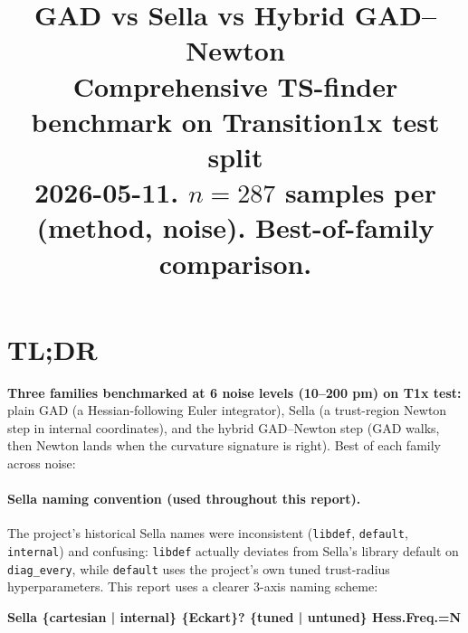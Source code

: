 \documentclass[11pt]{article}
\title{\Large\textbf{GAD vs Sella vs Hybrid GAD--Newton}\\[4pt]
\large Comprehensive TS-finder benchmark on Transition1x test split\\[2pt]
\normalsize 2026-05-11. $n=287$ samples per (method, noise). Best-of-family comparison.}
\author{}
\date{}
\begin{document}
\maketitle
\thispagestyle{empty}

\section*{TL;DR}

\textbf{Three families benchmarked at 6 noise levels (10--200 pm) on
T1x test:} plain GAD (a Hessian-following Euler integrator), Sella (a
trust-region Newton step in internal coordinates), and the hybrid
GAD--Newton step (GAD walks, then Newton lands when the curvature
signature is right). Best of each family across noise:

\begin{center}\small{}
\end{center}

\paragraph{Sella naming convention (used throughout this report).}
The project's historical Sella names were inconsistent (\texttt{libdef},
\texttt{default}, \texttt{internal}) and confusing: \texttt{libdef}
actually deviates from Sella's library default on \texttt{diag\_every},
while \texttt{default} uses the project's own tuned trust-radius
hyperparameters. This report uses a clearer 3-axis naming scheme:

\begin{center}\footnotesize
\textbf{Sella \{cartesian | internal\} \{Eckart\}? \{tuned | untuned\} Hess.Freq.=N}
\end{center}
\end{document}
